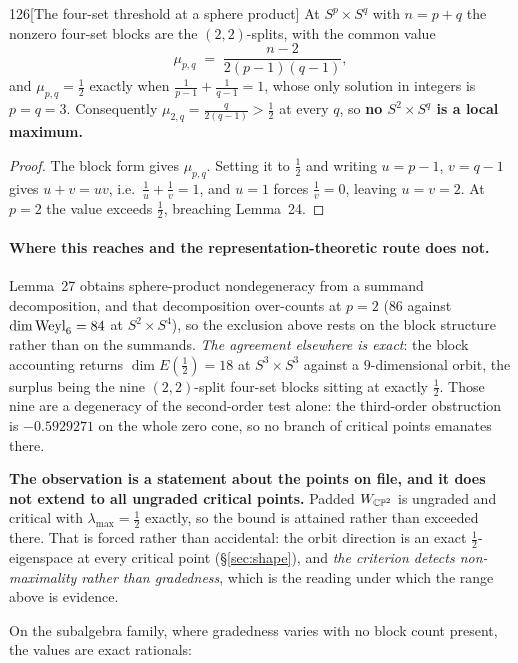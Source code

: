 \begin{Lem}{126}[The four-set threshold at a sphere product]
At $S^p\times S^q$ with $n=p+q$ the nonzero four-set blocks are the $(2,2)$-splits, with the common value
\[
\mu_{p,q}\;=\;\frac{n-2}{2(p-1)(q-1)},
\]
and $\mu_{p,q}=\tfrac12$ exactly when $\tfrac1{p-1}+\tfrac1{q-1}=1$, whose only solution in integers is $p=q=3$. Consequently $\mu_{2,q}=\tfrac q{2(q-1)}>\tfrac12$ at every $q$, so \textbf{no $S^2\times S^q$ is a local maximum.}
\end{Lem}

\begin{proof}
The block form gives $\mu_{p,q}$. Setting it to $\tfrac12$ and writing $u=p-1$, $v=q-1$ gives $u+v=uv$, i.e.\ $\tfrac1u+\tfrac1v=1$, and $u=1$ forces $\tfrac1v=0$, leaving $u=v=2$. At $p=2$ the value exceeds $\tfrac12$, breaching Lemma~24.
\end{proof}

\paragraph{Where this reaches and the representation-theoretic route does not.} Lemma~27 obtains sphere-product nondegeneracy from a summand decomposition, and that decomposition over-counts at $p=2$ ($86$ against $\dim\mathrm{Weyl}_6=84$ at $S^2\times S^4$), so the exclusion above rests on the block structure rather than on the summands. \emph{The agreement elsewhere is exact}: the block accounting returns $\dim E(\tfrac12)=18$ at $S^3\times S^3$ against a $9$-dimensional orbit, the surplus being the nine $(2,2)$-split four-set blocks sitting at exactly $\tfrac12$. Those nine are a degeneracy of the second-order test alone: the third-order obstruction is $-0.5929271$ on the whole zero cone, so no branch of critical points emanates there.

\begin{remarkstar}
\textbf{The observation is a statement about the points on file, and it does not extend to all ungraded critical points.} Padded $W_{\mathbb{CP}^2}$ is ungraded and critical with $\lambda_{\max}=\tfrac12$ exactly, so the bound is attained rather than exceeded there. That is forced rather than accidental: the orbit direction is an exact $\tfrac12$-eigenspace at every critical point (\S\ref{sec:shape}), and \emph{the criterion detects non-maximality rather than gradedness}, which is the reading under which the range above is evidence.
\end{remarkstar}

On the subalgebra family, where gradedness varies with no block count present, the values are exact rationals:

